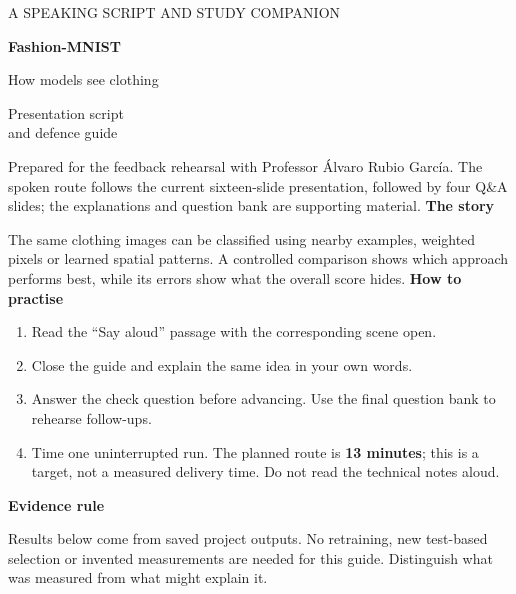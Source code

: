 \documentclass[11pt,a4paper]{article}
\newcounter{question}
\begin{document}
\thispagestyle{empty}
{\small\color{olive}A SPEAKING SCRIPT AND STUDY COMPANION}\par
\vspace{18mm}
{\Huge\bfseries Fashion-MNIST}\par\vspace{4mm}
{\LARGE How models see clothing}\par
\vspace{12mm}
{\Large Presentation script\\and defence guide}\par
\vspace{12mm}
Prepared for the feedback rehearsal with Professor \'Alvaro Rubio Garc\'ia. The spoken route follows the current sixteen-slide presentation, followed by four Q\&A slides; the explanations and question bank are supporting material.
\vspace{7mm}
\textbf{The story}\par
The same clothing images can be classified using nearby examples, weighted pixels or learned spatial patterns. A controlled comparison shows which approach performs best, while its errors show what the overall score hides.
\vspace{7mm}
\textbf{How to practise}
\begin{enumerate}
\item Read the ``Say aloud'' passage with the corresponding scene open.
\item Close the guide and explain the same idea in your own words.
\item Answer the check question before advancing. Use the final question bank to rehearse follow-ups.
\item Time one uninterrupted run. The planned route is \textbf{13 minutes}; this is a target, not a measured delivery time. Do not read the technical notes aloud.
\end{enumerate}
\vfill
\textbf{Evidence rule}\par
Results below come from saved project outputs. No retraining, new test-based selection or invented measurements are needed for this guide. Distinguish what was measured from what might explain it.
\end{document}
